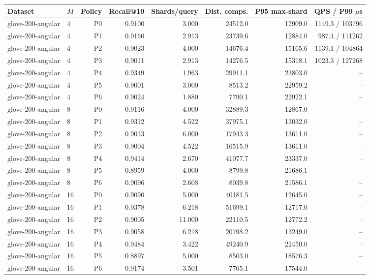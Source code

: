\begin{tabular}{llrrrrrr}
\toprule
Dataset & $M$ & Policy & Recall@10 & Shards/query & Dist. comps. & P95 max-shard & QPS / P99 $\mu$s \\
\midrule
glove-200-angular & 4 & P0 & 0.9100 & 3.000 & 24512.0 & 12909.0 & 1149.3 / 103796 \\
glove-200-angular & 4 & P1 & 0.9160 & 2.913 & 23739.6 & 12884.0 & 987.4 / 111262 \\
glove-200-angular & 4 & P2 & 0.9023 & 4.000 & 14676.4 & 15165.6 & 1139.1 / 104864 \\
glove-200-angular & 4 & P3 & 0.9011 & 2.913 & 14276.5 & 15318.1 & 1023.3 / 127268 \\
glove-200-angular & 4 & P4 & 0.9349 & 1.963 & 29911.1 & 23803.0 & -- \\
glove-200-angular & 4 & P5 & 0.9001 & 3.000 & 8513.2 & 22959.2 & -- \\
glove-200-angular & 4 & P6 & 0.9024 & 1.880 & 7790.1 & 22922.1 & -- \\
glove-200-angular & 8 & P0 & 0.9116 & 4.000 & 32889.3 & 12867.0 & -- \\
glove-200-angular & 8 & P1 & 0.9312 & 4.522 & 37975.1 & 13032.0 & -- \\
glove-200-angular & 8 & P2 & 0.9013 & 6.000 & 17943.3 & 13611.0 & -- \\
glove-200-angular & 8 & P3 & 0.9004 & 4.522 & 16515.9 & 13611.0 & -- \\
glove-200-angular & 8 & P4 & 0.9414 & 2.670 & 41077.7 & 23337.0 & -- \\
glove-200-angular & 8 & P5 & 0.8959 & 4.000 & 8799.8 & 21686.1 & -- \\
glove-200-angular & 8 & P6 & 0.9096 & 2.608 & 8039.8 & 21586.1 & -- \\
glove-200-angular & 16 & P0 & 0.9090 & 5.000 & 40181.5 & 12645.0 & -- \\
glove-200-angular & 16 & P1 & 0.9378 & 6.218 & 51699.1 & 12717.0 & -- \\
glove-200-angular & 16 & P2 & 0.9005 & 11.000 & 22110.5 & 12772.2 & -- \\
glove-200-angular & 16 & P3 & 0.9058 & 6.218 & 20798.2 & 13249.0 & -- \\
glove-200-angular & 16 & P4 & 0.9484 & 3.422 & 49240.9 & 22450.0 & -- \\
glove-200-angular & 16 & P5 & 0.8897 & 5.000 & 8503.0 & 18576.3 & -- \\
glove-200-angular & 16 & P6 & 0.9174 & 3.501 & 7765.1 & 17544.0 & -- \\

\end{tabular}
